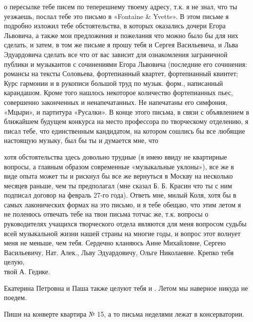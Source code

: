 
\noindent
о пересылке тебе писем по теперешнему твоему адресу, т.к. я не знал, что ты
уезжаешь, послал тебе это письмо в «Fontaine \& Yvette». В этом письме я
подробно изложил тебе обстоятельства, в которых оказались дочери Егора
Львовича, а также мои предложения и пожелания что можно было бы для них
сделать, и затем, в том же письме я прошу тебя и Сергея Васильевича, и Льва
Эдуардовича сделать все что от вас зависит для ознакомления заграничной публики
и музыкантов с сочинениями Егора Львовича (последние его сочинения: романсы на
тексты Соловьева, фортепианный квартет, фортепианный квинтет; Курс гармонии и в
рукописи большой труд по музык. форм., написанный карандашом. Кроме того нашлось
некоторое количество фортепианных пьес, совершенно законченных и ненапечатанных.
Не напечатаны его симфония, «Мцыри», и партитура «Русалки». В конце этого
письма, в связи с объявлением в ближайшем будущем конкурса на место профессора
по творческому отделению, я писал тебе, что единственным кандидатом, на котором
сошлись бы все любящие настоящую музыку, был бы ты и думается мне, что


\noindent
хотя обстоятельства здесь довольно трудные (я имею ввиду не квартирные вопросы,
а главным образом современные «музыкальные уклоны»), все же в виде опыта может
ты и рискнул бы все же вернуться в Москву на несколько месяцев раньше, чем ты
предполагал (мне сказал Б. Б. Красин что ты с ним подписал договор на февраль
27-го года). Ответь мне, милый Коля, хотя бы в самых лаконических формах на это
письмо, и я тебе обещаю, что этим летом я не поленюсь отвечать тебе на твои
письма тотчас же, т.к. вопросы о руководителях учащихся творческого отдела
являются для меня вопросом судьбы всей музыкальной жизни нашей страны на многие
годы, и вопрос этот волнует меня не меньше, чем тебя. Сердечно кланяюсь Анне
Михайловне, Сергею Васильевичу, Нат. Алек., Льву Эдуардовичу, Ольге Николаевне.
Крепко тебя целую, \\ твой А. Гедике.

Екатерина Петровна и Паша также целуют тебя и .
Летом мы наверное никуда не поедем.

Пиши на конверте квартира № 15, а то письма неделями лежат в консерватории.
